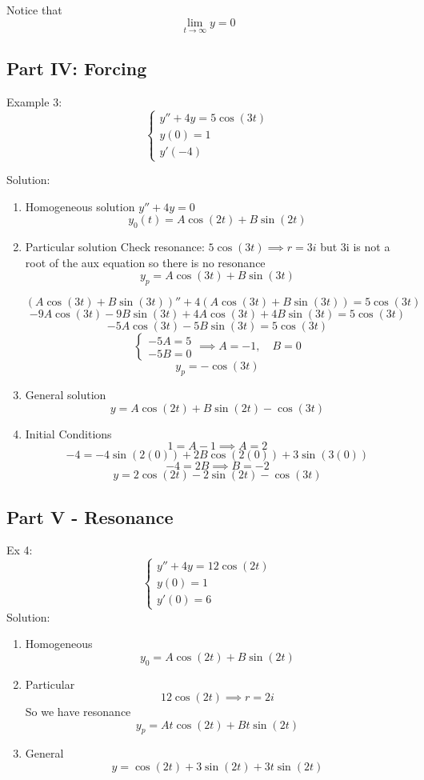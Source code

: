 \documentclass[12pt]{article}
\begin{document}
Notice that
\[\lim_{t \to \infty} y = 0\]

\subsection*{Part IV: Forcing}
Example 3: 
\[\begin{cases}
    y'' + 4y = 5\cos(3t)\\
    y(0) = 1\\
    y'(-4)
\end{cases}\]

Solution:
\begin{enumerate}
    \item Homogeneous solution $y'' + 4y = 0$
    \[y_0 (t) = A \cos(2t) + B \sin(2t)\] 

    \item Particular solution 
    Check resonance: $5\cos (3t) \implies r = 3i$ but 3i is not a root of the aux equation so there is no resonance 
    \[y_p = A \cos(3t) + B\sin(3t)\]

    \[( A \cos(3t) + B\sin(3t))'' + 4( A \cos(3t) + B\sin(3t)) = 5\cos(3t)\]
    \[-9A \cos(3t) - 9B \sin(3t) + 4A\cos(3t) + 4B \sin(3t) = 5\cos(3t)\]
    \[-5A\cos(3t ) - 5B \sin (3t) = 5\cos(3t)\]
    \[\begin{cases}
        -5A = 5\\
        -5B = 0
    \end{cases} \implies A = -1, \quad B = 0\]
    \[y_p = -\cos(3t)\]

    \item General solution
    \[y = A\cos(2t) + B\sin(2t) - \cos(3t)\]

    \item Initial Conditions 
    \[1 = A - 1 \implies A = 2\]
    \[-4 = -4\sin(2(0)) + 2B\cos(2(0)) + 3\sin(3(0))\]
    \[-4 = 2B \implies B = -2\]
    \[\boxed{y = 2\cos(2t) - 2\sin(2t) -\cos(3t)}\]
\end{enumerate}

\subsection*{Part V - Resonance} 
Ex 4:
\[\begin{cases}
    y'' + 4y = 12\cos(2t)\\
    y(0) = 1\\
    y'(0)= 6
\end{cases}\]
Solution:
\begin{enumerate}
    \item Homogeneous
    \[y_0 = A\cos(2t) + B\sin(2t)\]
    \item Particular 
    \[12\cos(2t) \implies r = 2i\]
    So we have resonance 
    \[y_p = At\cos(2t) + Bt\sin(2t)\]

    \item General 
    \[y = \cos(2t) + 3\sin(2t) + 3t\sin(2t)\]
\end{enumerate}
\end{document}
